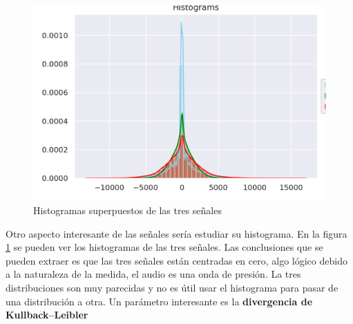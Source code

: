 \begin{figure}[h!]
	\centering
	\includegraphics[width=0.9\columnwidth]{figures/hist_time.png}
	\caption{Histogramas superpuestos de las tres señales}
	\label{fig: hist_time}
\end{figure}

Otro aspecto interesante de las señales sería estudiar su histograma. En la figura \ref{fig: hist_time} se pueden ver los histogramas de las tres señales. Las conclusiones que se pueden extraer es que las tres señales están centradas en cero, algo lógico debido a la naturaleza de la medida, el audio es una onda de presión. La tres distribuciones son muy parecidas y no es útil usar el histograma para pasar de una distribución a otra. Un parámetro interesante es la \textbf{divergencia de Kullback–Leibler}